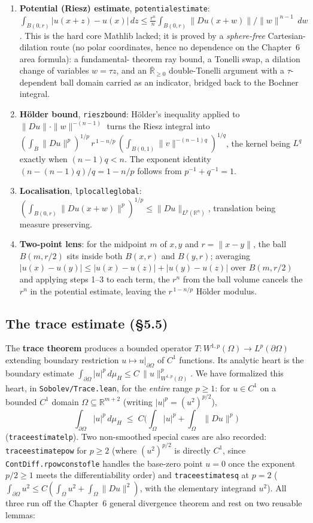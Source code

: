 ﻿\documentclass[12pt, a4paper]{article}
\renewcommand{\_}{\origunderscore\allowbreak}
\theoremstyle{definition}
\theoremstyle{plain}
\begin{document}
\begin{enumerate}
  \item \textbf{Potential (Riesz) estimate}, \texttt{potential\_estimate}:
    $\int_{B(0,r)}|u(x+z)-u(x)|\,dz\le\tfrac{r^n}{n}\int_{B(0,r)}\|Du(x+w)\|/\|w\|^{\,n-1}\,dw$.
    This is the hard core Mathlib lacked; it is proved by a \emph{sphere-free} Cartesian-dilation
    route (no polar coordinates, hence no dependence on the Chapter~6 area formula): a fundamental-
    theorem ray bound, a Tonelli swap, a dilation change of variables $w=\tau z$, and an
    $\overline{\mathbb{R}}_{\ge0}$ double-Tonelli argument with a $\tau$-dependent ball domain carried
    as an indicator, bridged back to the Bochner integral.
  \item \textbf{Hölder bound}, \texttt{riesz\_bound}: Hölder's inequality applied to
    $\|Du\|\cdot\|w\|^{-(n-1)}$ turns the Riesz integral into
    $(\int_B\|Du\|^p)^{1/p}\,r^{\,1-n/p}\,(\int_{B(0,1)}\|v\|^{-(n-1)q})^{1/q}$, the kernel being
    $L^q$ exactly when $(n-1)q<n$.  The exponent identity $(n-(n-1)q)/q=1-n/p$ follows from
    $p^{-1}+q^{-1}=1$.
  \item \textbf{Localisation}, \texttt{lp\_local\_le\_global}: $(\int_{B(0,r)}\|Du(x+w)\|^p)^{1/p}\le
    \|Du\|_{L^p(\mathbb{R}^n)}$, translation being measure preserving.
  \item \textbf{Two-point lens}: for the midpoint $m$ of $x,y$ and $r=\|x-y\|$, the ball $B(m,r/2)$
    sits inside both $B(x,r)$ and $B(y,r)$; averaging $|u(x)-u(y)|\le|u(x)-u(z)|+|u(y)-u(z)|$ over
    $B(m,r/2)$ and applying steps 1--3 to each term, the $r^n$ from the ball volume cancels the
    $r^n$ in the potential estimate, leaving the $r^{\,1-n/p}$ Hölder modulus.
\end{enumerate}

\subsection{The trace estimate (§5.5)}

The \textbf{trace theorem} produces a bounded operator $T\colon W^{1,p}(\Omega)\to L^p(\partial\Omega)$
extending boundary restriction $u\mapsto u|_{\partial\Omega}$ of $C^1$ functions.  Its analytic heart
is the boundary estimate $\int_{\partial\Omega}|u|^p\,d\mu_H\le C\,\|u\|_{W^{1,p}(\Omega)}^p$.  We have
formalized this heart, in \texttt{Sobolev/\allowbreak Trace.\allowbreak lean}, for the \emph{entire}
range $p\ge 1$: for $u\in C^1$ on a bounded $C^1$ domain $\Omega\subseteq\mathbb{R}^{m+2}$ (writing
$|u|^p=(u^2)^{p/2}$),
\[
  \int_{\partial\Omega} |u|^p\,d\mu_H \;\le\; C\Big(\int_\Omega |u|^p + \int_\Omega \|Du\|^p\Big)
\]
(\texttt{trace\_estimate\_lp}).  Two non-smoothed special cases are also recorded:
\texttt{trace\_estimate\_pow} for $p\ge 2$ (where $(u^2)^{p/2}$ is directly $C^1$, since
\texttt{ContDiff.rpow\_const\_of\_le} handles the base-zero point $u=0$ once the exponent $p/2\ge 1$
meets the differentiability order) and \texttt{trace\_estimate\_sq} at $p=2$
($\int_{\partial\Omega}u^2\le C(\int_\Omega u^2+\int_\Omega\|Du\|^2)$, with the elementary integrand
$u^2$).  All three run off the Chapter~6 general divergence theorem and rest on two reusable lemmas:
\end{document}
